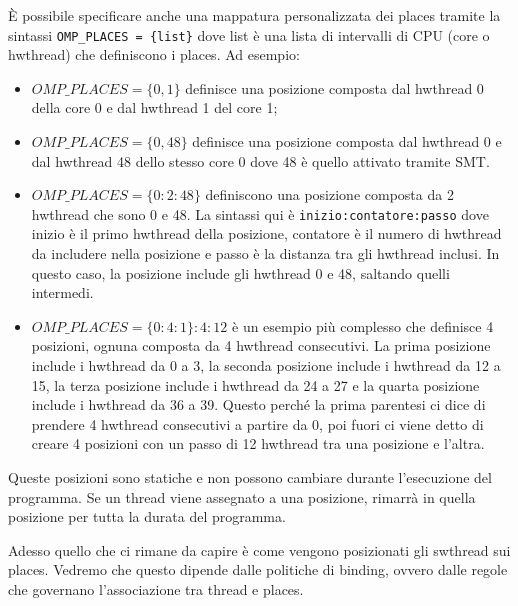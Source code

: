 È possibile specificare anche una mappatura personalizzata dei places tramite la sintassi \texttt{OMP\_PLACES = \{list\}} dove list è una lista di intervalli di CPU (core o hwthread) che definiscono i places. Ad esempio:
\begin{itemize}
    \item $OMP\_PLACES = \{0,1\}$ definisce una posizione composta dal hwthread 0 della core 0 e dal hwthread 1 del core 1;
    \item $OMP\_PLACES = \{0,48\}$ definisce una posizione composta dal hwthread 0 e dal hwthread 48 dello stesso core 0 dove 48 è quello attivato tramite SMT.
    \item $OMP\_PLACES = \{0:2:48\}$ definiscono una posizione composta da 2 hwthread che sono 0 e 48. La sintassi qui è \texttt{inizio:contatore:passo} dove inizio è il primo hwthread della posizione, contatore è il numero di hwthread da includere nella posizione e passo è la distanza tra gli hwthread inclusi. In questo caso, la posizione include gli hwthread 0 e 48, saltando quelli intermedi.
    \item $OMP\_PLACES = \{0:4:1\}:4:12$ è un esempio più complesso che definisce 4 posizioni, ognuna composta da 4 hwthread consecutivi. La prima posizione include i hwthread da 0 a 3, la seconda posizione include i hwthread da 12 a 15, la terza posizione include i hwthread da 24 a 27 e la quarta posizione include i hwthread da 36 a 39. Questo perché la prima parentesi ci dice di prendere 4 hwthread consecutivi a partire da 0, poi fuori ci viene detto di creare 4 posizioni con un passo di 12 hwthread tra una posizione e l'altra.
\end{itemize}
Queste posizioni sono statiche e non possono cambiare durante l'esecuzione del programma. Se un thread viene assegnato a una posizione, rimarrà in quella posizione per tutta la durata del programma.

Adesso quello che ci rimane da capire è come vengono posizionati gli swthread sui places. Vedremo che questo dipende dalle politiche di binding, ovvero dalle regole che governano l'associazione tra thread e places. 
